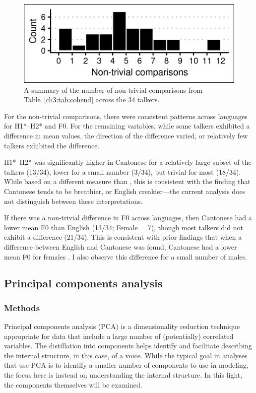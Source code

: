 \begin{figure}[htbp]
\begin{center}
\includegraphics[width=0.875\linewidth]{figures/3-non-trivial_counts_by_talker.png} 
\caption{A summary of the number of non-trivial comparisons from Table~\ref{ch3:tab:cohend} across the 34 talkers.}
\label{ch3:fig:ntcounts}
\end{center}
\end{figure}

For the non-trivial comparisons, there were consistent patterns across languages for H1*--H2* and F0. For the remaining variables, while some talkers exhibited a difference in mean values, the direction of the difference varied, or relatively few talkers exhibited the difference. 

H1*--H2* was significantly higher in Cantonese for a relatively large subset of the talkers (13/34), lower for a small number (3/34), but trivial for most (18/34). While based on a different measure than \citep{ng_2012_ltas}, this is consistent with the finding that Cantonese tends to be breathier, or English creakier---the current analysis does not distinguish between these interpretations.

If there was a non-trivial difference in F0 across languages, then Cantonese had a lower mean F0 than English (13/34; Female = 7), though most talkers did not exhibit a difference (21/34). This is consistent with prior findings that when a difference between English and Cantonese was found, Cantonese had a lower mean F0 for females \citep{ng_2012_ltas,altenberg_2006_f0}. I also observe this difference for a small number of males. 


\subsection{Principal components analysis}\label{ch3:sec:pca}
\subsubsection{Methods}
Principal components analysis (PCA) is a dimensionality reduction technique appropriate for data that include a large number of (potentially) correlated variables. The distillation into components helps identify and facilitate describing the internal structure, in this case, of a voice. While the typical goal in analyses that use PCA is to identify a smaller number of components to use in modeling, the focus here is instead on understanding the internal structure. In this light, the components themselves will be examined.

